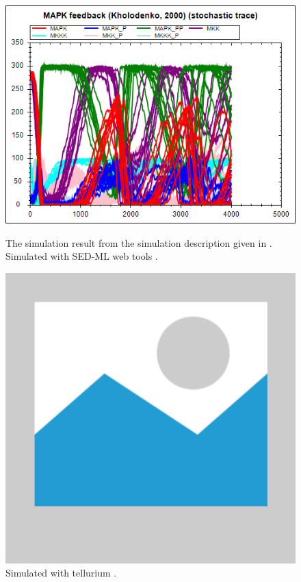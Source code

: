 \begin{figure}[ht]
    \centering
    \begin{minipage}{0.47\textwidth}
        \centering
        \includegraphics[width=1.0\textwidth]{examples/repeated-stochastic-runs/results/sedml_webtools/plot1}
        \caption{The simulation result from the simulation description given in . Simulated with SED-ML web tools \citep{bergmann2017sed}.}
    \end{minipage}\hfill
    \begin{minipage}{0.47\textwidth}
        \centering
        \includegraphics[width=1.0\textwidth]{examples/placeholder}
        \caption{Simulated with tellurium \citep{tellurium}.}
    \end{minipage}
    \label{fig:repeated-stochastic-runs}
\end{figure}

